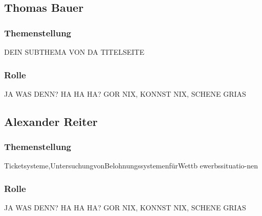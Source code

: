 \subsection{Thomas Bauer}
\subsubsection{Themenstellung}
DEIN SUBTHEMA VON DA TITELSEITE
\subsubsection{Rolle}
JA WAS DENN? HA HA HA? GOR NIX, KONNST NIX, SCHENE GRIAS

\subsection{Alexander Reiter}
\subsubsection{Themenstellung}
Ticketsysteme,UntersuchungvonBelohnungssystemenfürWettb ewerbssituatio-nen
\subsubsection{Rolle}
JA WAS DENN? HA HA HA? GOR NIX, KONNST NIX, SCHENE GRIAS

\newpage